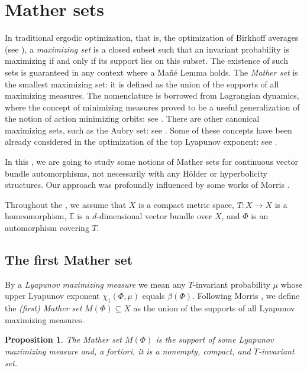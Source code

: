 \documentclass[JEP,XML,SOM,Unicode]{cedram}
\theoremstyle{plain}
\newtheorem{proposition}[theorem]{Proposition}
\theoremstyle{definition}
\newcommand{\EE}{\mathbb{E}}
\begin{document}
\section{Mather sets} \label{s.Mather}

In traditional ergodic optimization, that is, the optimization of Birkhoff averages (see
\cite{Jenkinson_survey,Jenkinson_survey_new,Garibaldi_book}), a \emph{maximizing set} is a closed subset such that an invariant probability is maximizing if and only if its support lies on this subset. The existence of such sets is guaranteed in any context where a Mañé Lemma holds.
The \emph{Mather set} is the smallest maximizing set: it is defined as the union of the supports of all maximizing measures. The nomenclature is borrowed from Lagrangian dynamics, where the concept of minimizing measures proved to be a useful generalization of the notion of action minimizing orbits: see \cite{Mat}. There are other canonical maximizing sets, such as the Aubry set: see \eg \cite{Garibaldi_book}. Some of these concepts have been already considered in the optimization of the top Lyapunov exponent: see \cite{Morris_Mather,GG}.

In this , we are going to study some notions of Mather sets for continuous vector bundle automorphisms, not necessarily with any Hölder or hyperbolicity structures. Our approach was profoundly influenced by some works of Morris \cite{Morris_rapidly,Morris_Mather}.

Throughout the , we assume that $X$ is a compact metric space, \hbox{$T \colon X \to X$} is a homeomorphism, $\EE$ is a $d$-dimensional vector bundle over $X$, and $\Phi$ is an automorphism covering $T$.

\subsection{The first Mather set}\label{ss.first_Mather}

By a \emph{Lyapunov maximizing measure} we mean any $T$-invariant probability $\mu$ whose upper Lyapunov exponent $ \chi_1(\Phi, \mu)$ equals $\beta(\Phi) $.
Following Morris \cite{Morris_Mather}, we define the \emph{(first) Mather set} $M(\Phi) \subseteq X$ as the union of the supports of all Lyapunov maximizing measures.

\begin{proposition}\label{p.Mather_support}
The Mather set $M(\Phi)$ is the support of some Lyapunov maximizing measure and, a fortiori, it is a nonempty, compact, and $T$-invariant set.
\end{proposition}
\end{document}
